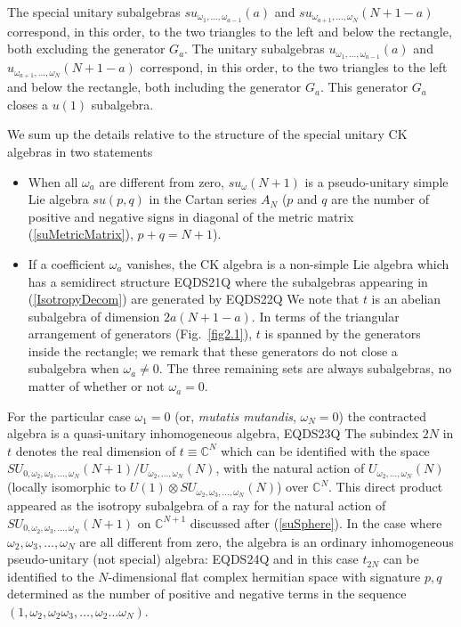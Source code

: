 \documentclass[12pt]{article}
\begin{document}
The special unitary subalgebras $su_{{\omega}_1,\dots,{\omega}_{a-1}}(a)$  and
$su_{{\omega}_{a+1},\dots,{\omega}_N}(N+1-a)$ correspond, in this order, to the
two triangles to the left and below the rectangle, both excluding the
generator ${G}_a$.  The unitary subalgebras
$u_{{\omega}_1,\dots,{\omega}_{a-1}}(a)$  and $u_{{\omega}_{a+1},\dots,{\omega}_N}(N+1-a)$
correspond, in this order, to the two triangles to the left and
below the rectangle, both including the generator ${G}_a$.
This generator ${G}_a$ closes a $u(1)$ subalgebra.

We sum up the details relative to the structure of the special unitary
CK algebras in two statements
\begin{itemize}
\item
When all ${\omega}_a$  are different from zero,
$su_{\omega}(N+1)$ is a  pseudo-unitary simple Lie algebra
$su({p,q})$ in the  Cartan series $A_N$ ($p$ and $q$ are the number
of positive and negative signs in diagonal of the metric matrix
(\ref{suMetricMatrix}), $p+q=N+1$).

\item
If a coefficient ${\omega}_a$ vanishes, the CK algebra is a
non-simple Lie algebra which has a semidirect structure
EQDS21Q
where the subalgebras appearing in (\ref{IsotropyDecom}) are
generated by
EQDS22Q
We note that $t$ is an abelian subalgebra of dimension $2a(N+1-a)$. In
terms of the triangular arrangement of generators (Fig.~\ref{fig2.1}), $t$
is spanned by the generators inside the rectangle; we remark that these
generators do not close a subalgebra when ${\omega}_a\neq 0$. The three remaining
sets are always subalgebras, no matter of whether or not ${\omega}_a=0$.
\end{itemize}

For the particular case ${\omega}_1=0$ (or, \emph{mutatis mutandis}, ${\omega}_N=0$) the
contracted algebra is a quasi-unitary inhomogeneous algebra,
 EQDS23Q 
The subindex $2N$ in $t$ denotes the real dimension of
$t \equiv {{\mathbb C}}^N$ which can be identified with the space
$SU_{0, {\omega}_2, {\omega}_3, \dots, {\omega}_N}(N+1) / U_{{\omega}_2,\dots,{\omega}_N}(N)$, with the
natural action of  $U_{{\omega}_2,\dots,{\omega}_N}(N)$ (locally isomorphic to $
U(1) \otimes SU_{{\omega}_2, {\omega}_3, \dots, {\omega}_N}(N)$) over ${{\mathbb C}}^N$. This
direct product appeared as the isotropy subalgebra of a ray for the natural
action of $SU_{0, {\omega}_2, {\omega}_3, \dots, {\omega}_N}(N+1)$ on ${{\mathbb C}}^{N+1}$ discussed after
(\ref{suSphere}). In the case where
${\omega}_2, {\omega}_3, \dots, {\omega}_N$ are all different from zero, the algebra is an
ordinary inhomogeneous pseudo-unitary (not special) algebra:
 EQDS24Q 
and in this case
$t_{2N}$ can be identified to the
$N$-dimensional flat complex hermitian space with signature
$p,q$ determined as the number of positive and negative terms in the sequence
$(1, {\omega}_2, {\omega}_2{\omega}_3, \dots, {\omega}_2\dots{\omega}_N)$.
\end{document}
